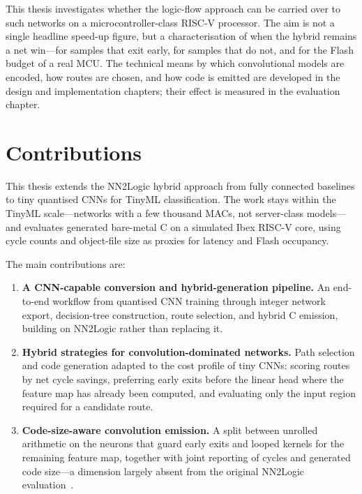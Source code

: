 This thesis investigates whether the logic-flow approach can be carried over to such networks on a microcontroller-class \mbox{RISC-V} processor.
The aim is not a single headline speed-up figure, but a characterisation of when the hybrid remains a net win---for samples that exit early, for samples that do not, and for the Flash budget of a real \ac{MCU}.
The technical means by which convolutional models are encoded, how routes are chosen, and how code is emitted are developed in the design and implementation chapters; their effect is measured in the evaluation chapter.

\section{Contributions}
\label{sec:contributions}

This thesis extends the NN2Logic hybrid approach from fully connected baselines to tiny quantised \acp{CNN} for TinyML classification.
The work stays within the TinyML scale---networks with a few thousand \acp{MAC}, not server-class models---and evaluates generated bare-metal C on a simulated Ibex \mbox{RISC-V} core, using cycle counts and object-file size as proxies for latency and Flash occupancy.

The main contributions are:
\begin{enumerate}
	\item \textbf{A CNN-capable conversion and hybrid-generation pipeline.}
	\label{contrib:pipeline}
	An end-to-end workflow from quantised \ac{CNN} training through integer network export, decision-tree construction, route selection, and hybrid C emission, building on NN2Logic rather than replacing it.

	\item \textbf{Hybrid strategies for convolution-dominated networks.}
	\label{contrib:hybrid}
	Path selection and code generation adapted to the cost profile of tiny \acp{CNN}: scoring routes by net cycle savings, preferring early exits before the linear head where the feature map has already been computed, and evaluating only the input region required for a candidate route.

	\item \textbf{Code-size-aware convolution emission.}
	\label{contrib:codesize}
	A split between unrolled arithmetic on the neurons that guard early exits and looped kernels for the remaining feature map, together with joint reporting of cycles and generated code size---a dimension largely absent from the original NN2Logic evaluation~\cite{stein2026nn2logic}.
\end{enumerate}

